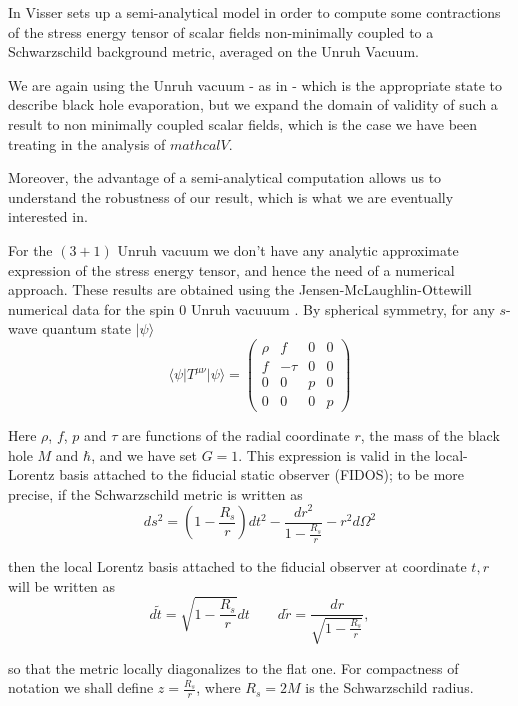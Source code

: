 In \cite[]{visser1997gravitational} Visser sets up a semi-analytical model in order to compute some contractions of the stress energy tensor of scalar fields non-minimally coupled to a Schwarzschild background metric, averaged on the Unruh Vacuum.

We are again using the Unruh vacuum - as in \cite[]{levi2016versatile} - which is the appropriate state to describe black hole evaporation, but we expand the domain of validity of such a result to non minimally coupled scalar fields, which is the case we have been treating in the analysis of \(mathcal{V}\).

Moreover, the advantage of a semi-analytical computation allows us to understand the robustness of our result, which is what we are eventually interested in.

For the \((3 + 1)\) Unruh vacuum we don't have any analytic approximate expression of the stress energy tensor, and hence the need of a numerical approach. These results are obtained  using the Jensen-McLaughlin-Ottewill numerical data for the spin \(0\) Unruh vacuuum \cite[]{jensen1991renormalized}. By spherical symmetry, for any \(s\)-wave quantum state \(\vert \psi\rangle\) 
\begin{equation}
    \langle\psi\vert T^{\mu\nu}\vert\psi\rangle = \begin{pmatrix}
        \rho & f & 0 & 0 \\
        f & -\tau & 0 & 0 \\
        0 & 0 & p & 0 \\
        0 & 0 & 0 & p
    \end{pmatrix}
\end{equation}

Here \(\rho\), \(f\), \(p\) and  \(\tau\) are functions of the radial coordinate \(r\), the mass of the black hole \(M\) and \(\hbar\), and we have set \(G = 1\). This expression is valid in the local-Lorentz basis attached to the fiducial static observer (FIDOS); to be more precise, if the Schwarzschild metric is written as 
\[
ds^2 =  \left(1 - \frac{R_s}{r}\right)dt^2  - \frac{dr^2}{1 - \frac{R_s}{r}} - r^2d\Omega^2
\]

then the local Lorentz basis attached to the fiducial observer at coordinate \(t, r\) will be written as 
\[
d\tilde{t} = \sqrt{1 - \frac{R_s}{r}} dt \quad \quad d\tilde{r} = \frac{dr}{\sqrt{1 - \frac{R_s}{r}}}, 
\]

so that the metric locally diagonalizes to the flat one.
For compactness of notation we shall define \(z = \frac{R_s}{r}\), where \(R_s = 2M\) is the Schwarzschild radius.

